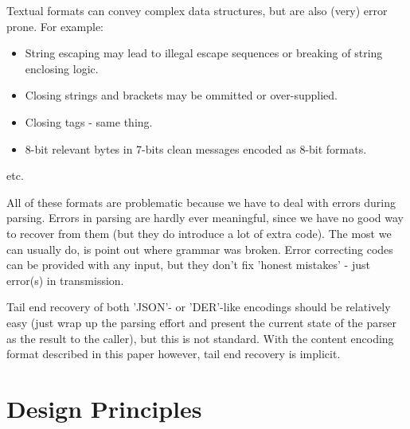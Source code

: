 Textual formats can convey complex data structures, but are also
(very) error prone. For example:

\begin{itemize}
\item String escaping may lead to illegal escape sequences or breaking
  of string enclosing logic.
\item Closing strings and brackets may be ommitted or over-supplied.
\item Closing tags - same thing.
\item 8-bit relevant bytes in 7-bits clean messages encoded as 8-bit formats.
\end{itemize}
etc.

All of these formats are problematic because we have to deal with
errors during parsing. Errors in parsing are hardly ever meaningful,
since we have no good way to recover from them (but they do introduce
a lot of extra code). The most we can usually do, is point out where
grammar was broken. Error correcting codes can be provided with any input,
but they don't fix 'honest mistakes' - just error(s) in transmission.

Tail end recovery of both 'JSON'- or 'DER'-like encodings should be
relatively easy (just wrap up the parsing effort and present the current
state of the parser as the result to the caller), but this is not standard.
With the content encoding format described in this paper however, tail end
recovery is implicit.

\section{Design Principles}
 
